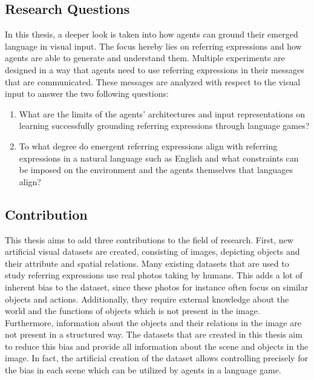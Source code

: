 \subsection{Research Questions}
In this thesis, a deeper look is taken into how agents can ground their emerged language in visual input.
The focus hereby lies on referring expressions and how agents are able to generate and understand them.
Multiple experiments are designed in a way that agents need to use referring expressions in their messages that are communicated.
These messages are analyzed with respect to the visual input to answer the two following questions:
\begin{enumerate}
      \item What are the limits of the agents' architectures and input representations on learning successfully grounding referring expressions through language games?
      \item To what degree do emergent referring expressions align with referring expressions in a natural language such as English and what constraints can be imposed on the environment and the agents themselves that languages align?
\end{enumerate}


\subsection{Contribution}
This thesis aims to add three contributions to the field of research.
First, new artificial visual datasets are created, consisting of images, depicting objects and their attribute and spatial relations.
Many existing datasets that are used to study referring expressions use real photos taking by humans.
This adds a lot of inherent bias to the dataset, since these photos for instance often focus on similar objects and actions.
Additionally, they require external knowledge about the world and the functions of objects which is not present in the image.
Furthermore, information about the objects and their relations in the image are not present in a structured way.
The datasets that are created in this thesis aim to reduce this bias and provide all information about the scene and objects in the image.
In fact, the artificial creation of the dataset allows controlling precisely for the bias in each scene which can be utilized by agents in a language game.

